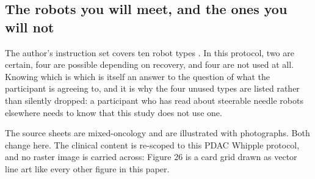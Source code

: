\subsection{The robots you will meet, and the ones you will not}

The author's instruction set covers ten robot types \cite{patrobotinst}. In this
protocol, two are certain, four are possible depending on recovery, and four are
not used at all. Knowing which is which is itself an answer to the question of
what the participant is agreeing to, and it is why the four unused types are
listed rather than silently dropped: a participant who has read about steerable
needle robots elsewhere needs to know that this study does not use one.

The source sheets are mixed-oncology and are illustrated with photographs. Both
change here. The clinical content is re-scoped to this PDAC Whipple protocol,
and no raster image is carried across: Figure 26 is a card grid drawn as vector
line art like every other figure in this paper.

